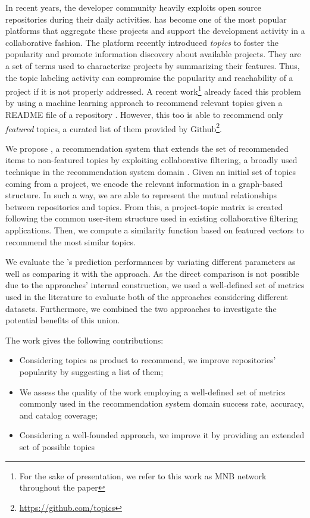 In recent years, the developer community heavily exploits open source repositories during their daily activities. \GH has become one of the most
popular platforms that aggregate these projects and
support the development activity in a collaborative fashion.
%
The platform recently introduced \emph{topics} to foster the popularity and promote information discovery about available projects. They are a set of terms used to characterize projects by summarizing their features.  
Thus, the topic labeling activity can compromise the popularity and reachability of a project if it is not properly addressed. A recent work\footnote{For the sake of presentation, we refer to this work as MNB network throughout the paper} already faced this problem by using a machine learning approach to recommend relevant topics given a README file of a repository \cite{10.1145/3383219.3383227}. However, this too is able to recommend only \emph{featured} topics, a curated list of them provided by Github\footnote{\url{https://github.com/topics}}.
 
We propose \CT, a recommendation system that extends the set of recommended items to non-featured topics by exploiting collaborative filtering, a broadly used technique in the recommendation system domain \cite{Schafer:2007:CFR:1768197.1768208}. Given an initial set of topics coming from a \GH project, we encode the relevant information in a graph-based structure. In such a way, we are able to represent the mutual relationships between repositories and topics. From this, a project-topic matrix is created following the common user-item structure used in existing collaborative filtering applications. Then, we compute a similarity function based on featured vectors to recommend the most similar topics.

We evaluate the \CT's prediction performances by variating different parameters as well as comparing it with the \MNB approach. As the direct comparison is not possible due to the approaches' internal construction, we used a well-defined set of metrics used in the literature to evaluate both of the approaches considering different datasets. Furthermore, we combined the two approaches to investigate the potential benefits of this union. 

The work gives the following contributions:
\begin{itemize}
\item Considering \GH topics as product to recommend, we improve repositories' popularity by suggesting a list of them;
\item We assess the quality of the work employing a well-defined set of metrics commonly used in the recommendation system domain \ie success rate, accuracy, and catalog coverage;
\item Considering a well-founded approach, we improve it by providing an extended set of possible topics  
\end{itemize}

